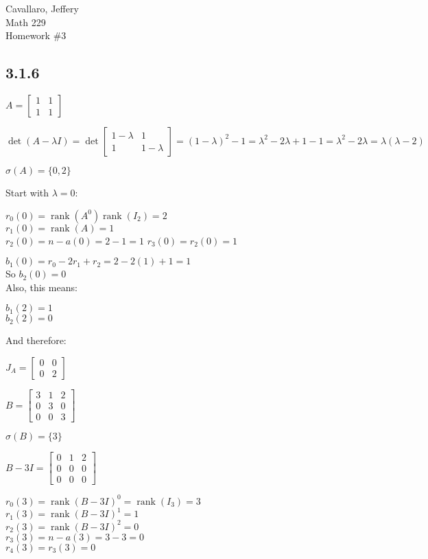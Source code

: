 \documentclass[letterpaper,12pt,fleqn]{article}
\renewcommand{\l}{\lambda}
\renewcommand{\o}{\sigma}
\DeclareMathOperator{\rnk}{rank}
\begin{document}
Cavallaro, Jeffery \\
Math 229 \\
Homework \#3

\bigskip

\subsection*{3.1.6}

$A=\begin{bmatrix} 1 & 1 \\ 1 & 1 \end{bmatrix}$

$\det(A-\l I)=\det\begin{bmatrix} 1-\l & 1 \\ 1 & 1-\l \end{bmatrix}=
(1-\l)^2-1=\l^2-2\l+1-1=\l^2-2\l=\l(\l-2)$

$\o(A)=\{0,2\}$

Start with $\l=0$:

$r_0(0)=\rnk(A^0)\rnk(I_2)=2$ \\
$r_1(0)=\rnk(A)=1$ \\
$r_2(0)=n-a(0)=2-1=1$
$r_3(0)=r_2(0)=1$

$b_1(0)=r_0-2r_1+r_2=2-2(1)+1=1$ \\
So $b_2(0)=0$ \\

Also, this means:

$b_1(2)=1$ \\
$b_2(2)=0$

And therefore:

$J_A=\begin{bmatrix} 0 & 0 \\ 0 & 2 \end{bmatrix}$

\bigskip

$B=\begin{bmatrix} 3 & 1 & 2 \\ 0 & 3 & 0 \\ 0 & 0 & 3 \end{bmatrix}$

$\o(B)=\{3\}$

$B-3I=\begin{bmatrix} 0 & 1 & 2 \\ 0 & 0 & 0 \\ 0 & 0 & 0 \end{bmatrix}$

$r_0(3)=\rnk(B-3I)^0=\rnk(I_3)=3$ \\
$r_1(3)=\rnk(B-3I)^1=1$ \\
$r_2(3)=\rnk(B-3I)^2=0$ \\
$r_3(3)=n-a(3)=3-3=0$ \\
$r_4(3)=r_3(3)=0$
\end{document}
